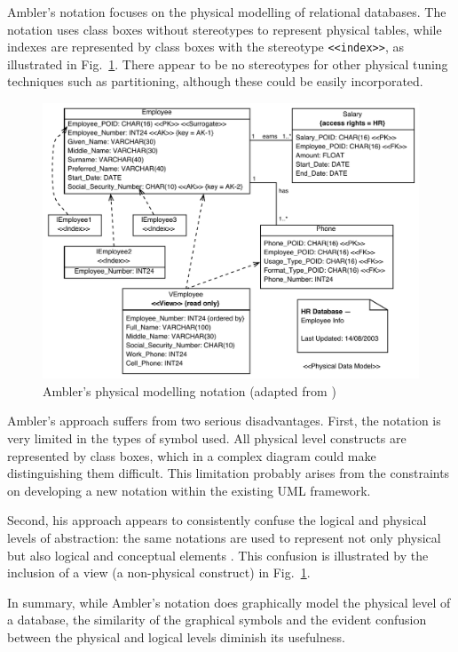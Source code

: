 \documentclass{llncs}
\begin{document}
Ambler's notation focuses on the physical modelling of relational
databases. The notation uses class boxes without stereotypes to
represent physical tables, while indexes are represented by class boxes
with the stereotype \verb|<<index>>|, as illustrated in
Fig.~\ref{fig-Ambler}. There appear to be no stereotypes for other
physical tuning techniques such as partitioning, although these could be
easily incorporated.

\begin{figure}
	\includegraphics[width=\columnwidth,keepaspectratio]{Ambler}
	\caption{Ambler's physical modelling notation (adapted from \cite{Ambl-SW-2003-ADT})}
	\label{fig-Ambler}
\end{figure}

Ambler's approach suffers from two serious disadvantages. First, the
notation is very limited in the types of symbol used. All physical
level constructs are represented by class boxes, which in a complex
diagram could make distinguishing them difficult. This limitation
probably arises from the constraints on developing a new notation within
the existing UML framework.

Second, his approach appears to consistently confuse the logical and
physical levels of abstraction: the same notations are used to represent
not only physical but also logical and conceptual elements
\cite{Ambl-SW-2003-ADT}. This confusion is illustrated by the inclusion
of a view (a non-physical construct) in Fig.~\ref{fig-Ambler}.

In summary, while Ambler's notation does graphically model the physical
level of a database, the similarity of the graphical symbols and the
evident confusion between the physical and logical levels diminish its
usefulness.
\end{document}
